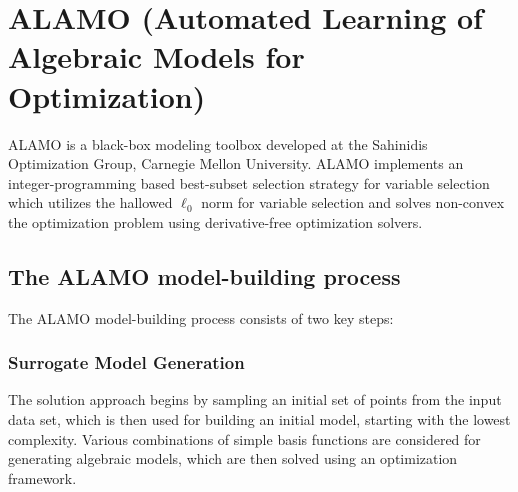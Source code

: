 \documentclass[a4paper,12pt]{article}
\begin{document}


\newpage
\section{ALAMO (Automated Learning of Algebraic Models for Optimization)}
ALAMO \cite{cozad2014learning,cozad2015combined,wilson2017alamo} is a black-box modeling toolbox developed at the Sahinidis Optimization Group, Carnegie Mellon University. ALAMO implements an integer-programming based best-subset selection strategy for variable selection which utilizes the hallowed $\ell_0$ norm for variable selection and solves non-convex the optimization problem using derivative-free optimization solvers. 
\subsection{The ALAMO model-building process}
The ALAMO model-building process consists of two key steps:
\subsubsection{Surrogate Model Generation}
The solution approach begins by sampling an initial set of points from the input data set, which is then used for building an initial model, starting with the lowest complexity. Various combinations of simple basis functions are considered for generating algebraic models, which are then solved using an optimization framework. 
\end{document}
